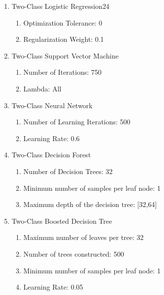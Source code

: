 \begin{enumerate}
    \item{Two-Class Logistic Regression}24
    
    \begin{enumerate}
        \item{Optimization Tolerance:} 0
        \item{Regularization Weight:} 0.1
    \end{enumerate}
    
    \item{Two-Class Support Vector Machine}
    
    \begin{enumerate}
        \item{Number of Iterations:} 750
        \item{Lambda:} All
    \end{enumerate}
    
    \item{Two-Class Neural Network}
    
    \begin{enumerate}
        \item{Number of Learning Iterations:} 500
        \item{Learning Rate:} 0.6
    \end{enumerate}
    
    \item{Two-Class Decision Forest}

    \begin{enumerate}
        \item{Number of Decision Trees:} 32
        \item{Minimum number of samples per leaf node:} 1
        \item{Maximum depth of the decision tree:} [32,64]
    \end{enumerate}
    
    \item{Two-Class Boosted Decision Tree}
    
    \begin{enumerate}
        \item{Maximum number of leaves per tree:} 32
        \item{Number of trees constructed:} 500
        \item{Minimum number of samples per leaf node:} 1
        \item{Learning Rate:} 0.05
    \end{enumerate}
    
\end{enumerate}



